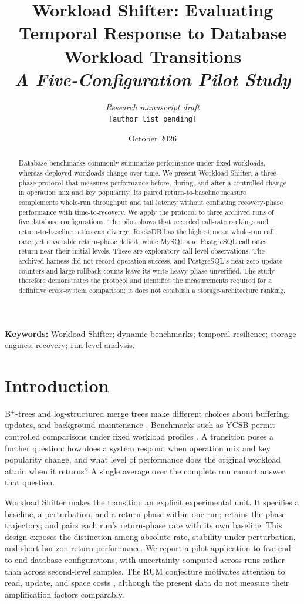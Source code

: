 \documentclass[10pt]{article}
\title{\textbf{Workload Shifter: Evaluating Temporal Response to Database Workload Transitions}\\[4pt]
       \large \textit{A Five-Configuration Pilot Study}}
\author{
  \textit{Research manuscript draft}\\[2pt]
  \small \texttt{[author list pending]}
}
\date{October 2026}
\begin{document}
\maketitle
\begin{abstract}
Database benchmarks commonly summarize performance under fixed workloads, whereas deployed workloads change over time. We present Workload Shifter, a three-phase protocol that measures performance before, during, and after a controlled change in operation mix and key popularity. Its paired return-to-baseline measure complements whole-run throughput and tail latency without conflating recovery-phase performance with time-to-recovery. We apply the protocol to three archived runs of five database configurations. The pilot shows that recorded call-rate rankings and return-to-baseline ratios can diverge: RocksDB has the highest mean whole-run call rate, yet a variable return-phase deficit, while MySQL and PostgreSQL call rates return near their initial levels. These are exploratory call-level observations. The archived harness did not record operation success, and PostgreSQL's near-zero update counters and large rollback counts leave its write-heavy phase unverified. The study therefore demonstrates the protocol and identifies the measurements required for a definitive cross-system comparison; it does not establish a storage-architecture ranking.
\end{abstract}
\noindent\textbf{Keywords:} Workload Shifter; dynamic benchmarks; temporal resilience; storage engines; recovery; run-level analysis.

\section{Introduction}
B$^+$-trees and log-structured merge trees make different choices about buffering, updates, and background maintenance \cite{oneil1996,graefe2010}. Benchmarks such as YCSB permit controlled comparisons under fixed workload profiles \cite{cooper2010}. A transition poses a further question: how does a system respond when operation mix and key popularity change, and what level of performance does the original workload attain when it returns? A single average over the complete run cannot answer that question.

Workload Shifter makes the transition an explicit experimental unit. It specifies a baseline, a perturbation, and a return phase within one run; retains the phase trajectory; and pairs each run's return-phase rate with its own baseline. This design exposes the distinction among absolute rate, stability under perturbation, and short-horizon return performance. We report a pilot application to five end-to-end database configurations, with uncertainty computed across runs rather than across second-level samples. The RUM conjecture motivates attention to read, update, and space costs \cite{athanassoulis2016}, although the present data do not measure their amplification factors comparably.
\end{document}
